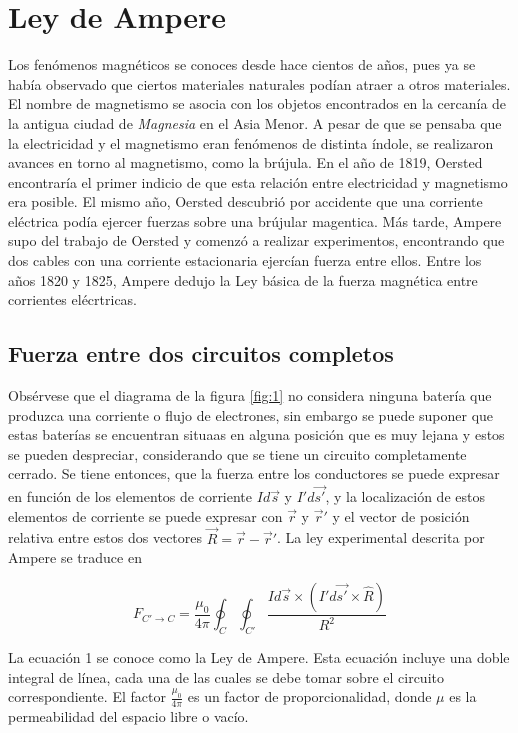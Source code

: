 \section{Ley de Ampere}
Los fenómenos magnéticos se conoces desde hace cientos de años, pues ya se había observado que ciertos materiales naturales podían atraer a otros materiales. El nombre de magnetismo se asocia con los objetos encontrados en la cercanía de la antigua ciudad de \emph{Magnesia} en el Asia Menor. A pesar de que se pensaba que la electricidad y el magnetismo eran fenómenos de distinta índole, se realizaron avances en torno al magnetismo, como la brújula. En el año de 1819, Oersted encontraría el primer indicio de que esta relación entre electricidad y magnetismo era posible. El mismo año, Oersted descubrió por accidente que una corriente eléctrica podía ejercer fuerzas sobre una brújular magentica. Más tarde, Ampere supo del trabajo de Oersted y comenzó a realizar experimentos, encontrando que dos cables con una corriente estacionaria ejercían fuerza entre ellos. Entre los años 1820 y 1825, Ampere dedujo la Ley básica de la fuerza magnética entre corrientes elécrtricas.

\subsection{Fuerza entre dos circuitos completos}


Obsérvese que el diagrama de la figura \ref{fig:1} no considera ninguna batería que produzca una corriente o flujo de electrones, sin embargo se puede suponer que estas baterías se encuentran situaas en alguna posición que es muy lejana y estos se pueden despreciar, considerando que se tiene un circuito completamente cerrado. Se tiene entonces, que la fuerza entre los conductores se puede expresar en función de los elementos de corriente $Id\vec{s}$ y $I'd\vec{s'}$, y la localización de estos elementos de corriente se puede expresar con $\vec{r}$ y $\vec{r}'$ y el vector de posición relativa entre estos dos vectores $\vec{R} = \vec{r} - \vec{r}'$. La ley experimental descrita por Ampere se traduce en

\begin{equation}
    F_{C' \rightarrow C}=\frac{\mu_0}{4\pi} \oint_C \oint_{C'} \frac{Id\vec{s}\times (I'd\vec{s'} \times \hat{R} ) }{R^2}
\end{equation}

La ecuación 1 se conoce como la Ley de Ampere. Esta ecuación incluye una doble integral de línea, cada una de las cuales se debe tomar sobre el circuito correspondiente. El factor $\frac{\mu_0}{4\pi}$ es un factor de proporcionalidad, donde $\mu$ es la permeabilidad del espacio libre o vacío.

